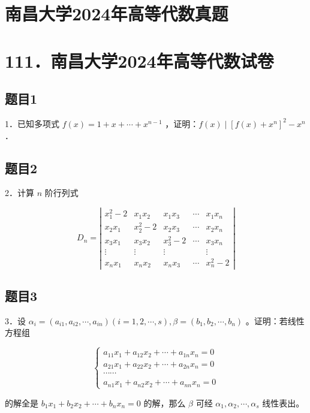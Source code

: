 \documentclass{article}
\begin{document}
\section*{南昌大学2024年高等代数真题}
\section*{111．南昌大学2024年高等代数试卷}

\subsection{题目1}
1．已知多项式 \(f(x)=1+x+\cdots+x^{n-1}\) ，证明：\(f(x) \mid\left[f(x)+x^{n}\right]^{2}-x^{n}\) ．

\subsection{题目2}
2．计算 \(n\) 阶行列式

\[
D_{n}=\left|\begin{array}{ccccc}
x_{1}^{2}-2 & x_{1} x_{2} & x_{1} x_{3} & \cdots & x_{1} x_{n} \\
x_{2} x_{1} & x_{2}^{2}-2 & x_{2} x_{3} & \cdots & x_{2} x_{n} \\
x_{3} x_{1} & x_{3} x_{2} & x_{3}^{2}-2 & \cdots & x_{3} x_{n} \\
\vdots & \vdots & \vdots & & \vdots \\
x_{n} x_{1} & x_{n} x_{2} & x_{n} x_{3} & \cdots & x_{n}^{2}-2
\end{array}\right|
\]

\subsection{题目3}
3．设 \(\alpha_{i}=\left(a_{i 1}, a_{i 2}, \cdots, a_{i n}\right)(i=1,2, \cdots, s), \beta=\left(b_{1}, b_{2}, \cdots, b_{n}\right)\) 。证明：若线性方程组

\[
\left\{\begin{array}{c}
a_{11} x_{1}+a_{12} x_{2}+\cdots+a_{1 n} x_{n}=0 \\
a_{21} x_{1}+a_{22} x_{2}+\cdots+a_{2 n} x_{n}=0 \\
\cdots \cdots \\
a_{n 1} x_{1}+a_{n 2} x_{2}+\cdots+a_{n n} x_{n}=0
\end{array}\right.
\]

的解全是 \(b_{1} x_{1}+b_{2} x_{2}+\cdots+b_{n} x_{n}=0\) 的解，那么 \(\beta\) 可经 \(\alpha_{1}, \alpha_{2}, \cdots, \alpha_{s}\) 线性表出。
\end{document}
